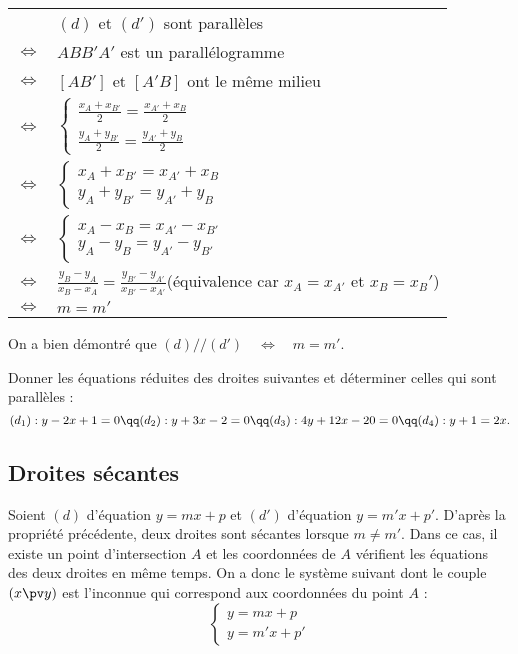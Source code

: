 \documentclass[10pt,openright,twoside,french]{book}
\begin{document}
\begin{Demo}
\renewcommand\arraystretch{1.75}
\begin{tabular}{ll}
    & $(d)$ et $(d')$ sont parallèles \\
    $\Leftrightarrow$ & $ABB'A'$ est un parallélogramme \\
    $\Leftrightarrow$ & $[AB']$ et $[A'B]$ ont le même milieu \\
    $\Leftrightarrow$ & $\left\{\begin{array}{rcl} \frac{x_A + x_{B'}}{2} = \frac{x_{A'} + x_{B}}{2} \\[7pt] \frac{y_A + y_{B'}}{2} = \frac{y_{A'} + y_{B}}{2} \end{array}\right.$ \\
    $\Leftrightarrow$ & $\left\{\begin{array}{rcl} x_A + x_{B'} = x_{A'} + x_{B} \\ y_A + y_{B'} = y_{A'} + y_{B} \end{array}\right.$ \\
    $\Leftrightarrow$ & $\left\{\begin{array}{rcl} x_A - x_{B} = x_{A'} - x_{B'} \\ y_A - y_{B} = y_{A'} - y_{B'} \end{array}\right.$ \\
    $\Leftrightarrow$ & $\frac{y_B - y_A}{x_B - x_A} = \frac{y_{B'} - y_{A'}}{x_{B' }- x_{A'}}$\qquad (équivalence car $x_A = x_{A'}$ et $x_B = x_B'$)\\
    $\Leftrightarrow$ & $m = m'$
\end{tabular}
\renewcommand\arraystretch{1}

On a bien démontré que $(d) /\!/ (d') \quad \Leftrightarrow \quad m = m'$.
\end{Demo}

\begin{Exemple}
    Donner les équations réduites des droites suivantes et déterminer celles qui sont parallèles :
    \[(d_1) : y - 2x + 1 = 0 \qq (d_2) : y + 3x - 2 = 0 \qq (d_3) : 4y + 12x - 20 = 0 \qq (d_4) : y + 1 = 2x.\]
\end{Exemple}

\subsection{Droites sécantes}
Soient $(d)$ d'équation $y = mx + p$ et $(d')$ d'équation $y = m'x + p'$. D'après la propriété précédente, deux droites sont sécantes lorsque $m \neq m'$.
Dans ce cas, il existe un point d'intersection $A$ et les coordonnées de $A$ vérifient les équations des deux droites en même temps. On a donc le système suivant dont le couple $(x \pv y)$ est l'inconnue qui correspond aux coordonnées du point $A$ :
\[\left\{\begin{array}{l} y = mx + p \\y = m'x + p' \end{array}\right.\]
\end{document}

